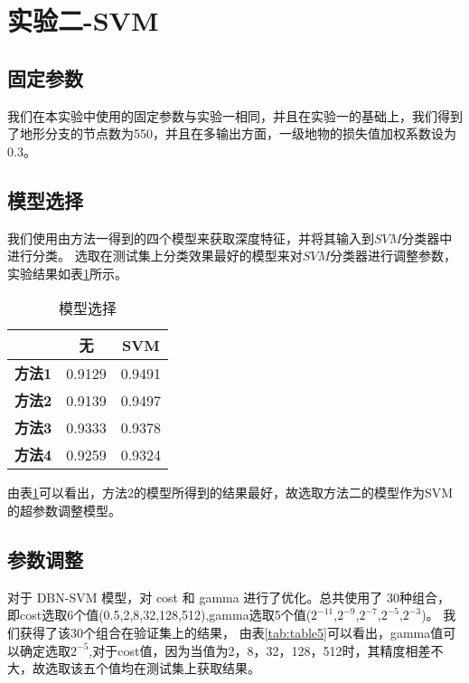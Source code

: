 \documentclass[lang=cn,11pt,a4paper,cite=authoryear]{elegantpaper}
\begin{document}
\section{实验二-SVM}
\subsection{固定参数}
我们在本实验中使用的固定参数与实验一相同，并且在实验一的基础上，我们得到了地形分支的节点数为550，并且在多输出方面，一级地物的损失值加权系数设为0.3。

\subsection{模型选择}
我们使用由方法一得到的四个模型来获取深度特征，并将其输入到$SVM$分类器中进行分类。
选取在测试集上分类效果最好的模型来对$SVM$分类器进行调整参数，实验结果如表\ref{tab:table4}所示。

\begin{table}[htbp]
  \centering
  \caption{模型选择}
    \begin{tabular}{|c|r|r|}
    \toprule
          & \multicolumn{1}{c|}{\textbf{无}} & \multicolumn{1}{c|}{\textbf{SVM}} \\
    \midrule
    \textbf{方法1} & 0.9129 & 0.9491 \\
    \midrule
    \textbf{方法2} & 0.9139 & \cellcolor[rgb]{ .753,  0,  0}0.9497 \\
    \midrule
    \textbf{方法3} & \cellcolor[rgb]{ .753,  0,  0}0.9333 & 0.9378 \\
    \midrule
    \textbf{方法4} & 0.9259 & 0.9324 \\
    \bottomrule
    \end{tabular}%
  \label{tab:table4}%
\end{table}%

由表\ref{tab:table4}可以看出，方法2的模型所得到的结果最好，故选取方法二的模型作为SVM的超参数调整模型。

\subsection{参数调整}
对于 DBN-SVM 模型，对 cost 和 gamma 进行了优化。总共使用了 30种组合，即cost选取6个值(0.5,2,8,32,128,512),gamma选取5个值($2^{-11}$,$2^{-9}$,$2^{-7}$,$2^{-5}$,$2^{-3}$)。
我们获得了该30个组合在验证集上的结果，
由表\ref{tab:table5}可以看出，gamma值可以确定选取$2^{-5}$,对于cost值，因为当值为2，8，32，128，512时，其精度相差不大，故选取该五个值均在测试集上获取结果。
\end{document}
